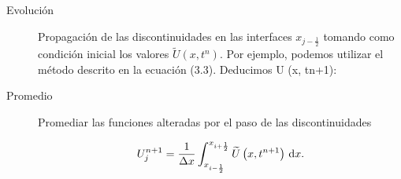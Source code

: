 \begin{frame}
\begin{description}
		\item[Evolución]

		      Propagación de las discontinuidades en las interfaces $x_{j-\frac{1}{2}}$ tomando como condición inicial los valores
		      \begin{math}
			      \widetilde{U}
			      \left(x,t^{n}\right)
		      \end{math}.
		      Por ejemplo, podemos utilizar el método descrito en la ecuación (3.3). Deducimos U (x, tn+1):

		\item[Promedio]

		      Promediar las funciones alteradas por el paso de las discontinuidades

		      \begin{equation*}
			      U^{n+1}_{j}=
			      \frac{1}{\Delta x}
			      \int_{x_{i-\frac{1}{2}}}^{x_{i+\frac{1}{2}}}
			      \widetilde{U}
			      \left(x,t^{n+1}\right)
			      \dl x.
		      \end{equation*}
	\end{description}
\end{frame}


